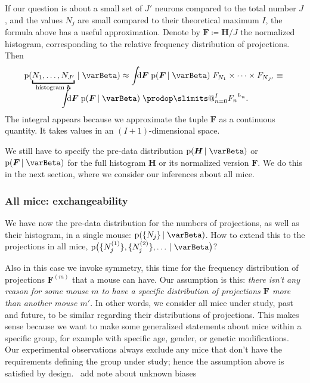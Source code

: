 \documentclass[\ifafour a4paper,12pt,\else a5paper,10pt,\fi%
onecolumn,oneside,article,%
british%
]{memoir}
\makeatletter
\theoremstyle{remark}
\theoremstyle{innote}
\def\prod{\DOTSI\prodop\slimits@}
\newcommand*{\di}{\mathrm{d}}%
\newcommand*{\defd}{\coloneqq}
\newcommand*{\pf}{\mathrm{p}}%
\renewcommand*{\|}[1][]{\nonscript\,#1\vert\nonscript\;\mathopen{}}
\newcommand*{\puzzle}{{\fontencoding{U}\fontfamily{fontawesometwo}\selectfont\symbol{225}}}
\newcommand{\mynote}[1]{ {\color{notecolour}\puzzle\ #1}}
\newcommand*{\yI}{\varBeta}
\newcommand*{\yF}{\bm{F}}
\newcommand*{\yFm}[1][m]{\yF^{(#1)}}
\newcommand*{\yh}{\bm{h}}
\newcommand*{\yH}{\bm{H}}
\newcommand*{\yNm}[1][m]{N^{(#1)}}
\DeclarePairedDelimiter\tu{\{}{\}}
\makeatother
\begin{document}
If our question is about a small set of $J'$ neurons compared to the total
number $J$, and the values $N_{j}$ are small compared to their theoretical
maximum $I$, the formula above has a useful approximation. Denote by
$\yF \defd \yH/J$ the normalized histogram, corresponding to the relative
frequency distribution of projections. Then
\begin{multline}
  \label{eq:definetti_Nj_infinite_approx}
  \pf(\underbracket{N_{1},\dotsc,N_{J'}}_{\text{histogram $\yh$}} \| \yI) \approx
\int\!\!\!\di\yF\;
\pf(\yF \| \yI)\; F_{N_{1}} \times \dotsm \times F_{N_{J'}}
\equiv{}\\[-2\jot]
\int\!\!\!\di\yF\;
\pf(\yF \| \yI)\; \prod_{n=0}^{I}{F_{n}}^{h_{n}}.
\end{multline}
The integral appears because we approximate the tuple $\yF$ as a continuous
quantity. It takes values in an $(I+1)$-dimensional space.


We still have to specify the pre-data distribution $\pf(\yH \| \yI)$ or
$\pf(\yF \| \yI)$ for the full histogram $\yH$ or its normalized version
$\yF$. We do this in the next section, where we consider our inferences
about all mice.

\subsubsection{All mice: exchangeability}
\label{sec:allmice_exch}

We have now the pre-data distribution for the numbers of projections, as
well as their histogram, in a single mouse: $\pf(\tu{N_{j}} \| \yI)$. How
to extend this to the projections in all mice,
$\pf\bigl(\tu{\yNm[1]_{j}}, \tu{\yNm[2]_{j}}, \dotsc \| \yI\bigr)$?

Also in this case we invoke symmetry, this time for the frequency
distribution of projections $\yFm$ that a mouse can have. Our assumption is
this: \emph{there isn't any reason for some mouse $m$ to have a specific
  distribution of projections $\yF$ more than another mouse $m'$}. In other
words, we consider all mice under study, past and future, to be similar
regarding their distributions of projections. This makes sense because we
want to make some generalized statements about mice within a specific
group, for example with specific age, gender, or genetic modifications. Our
experimental observations always exclude any mice that don't have the
requirements defining the group under study; hence the assumption above is
satisfied by design. \mynote{add note about unknown biases}
\end{document}
